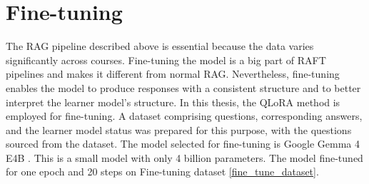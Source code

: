 \section{Fine-tuning}

The RAG pipeline described above is essential because the data varies significantly across courses. Fine-tuning the model is a big part of RAFT pipelines and makes it different from normal RAG.
Nevertheless, fine-tuning enables the model to produce responses with a consistent structure and to better interpret the learner model's structure.
In this thesis, the QLoRA method is employed for fine-tuning.
A dataset comprising questions, corresponding answers, and the learner model status was prepared for this purpose, with the questions sourced from the dataset.
The model selected for fine-tuning is Google Gemma 4 E4B \cite{gemmateam2026gemma4technicalreport}.
This is a small model with only 4 billion parameters.
The model fine-tuned for one epoch and 20 steps on Fine-tuning dataset \ref{fine_tune_dataset}.

